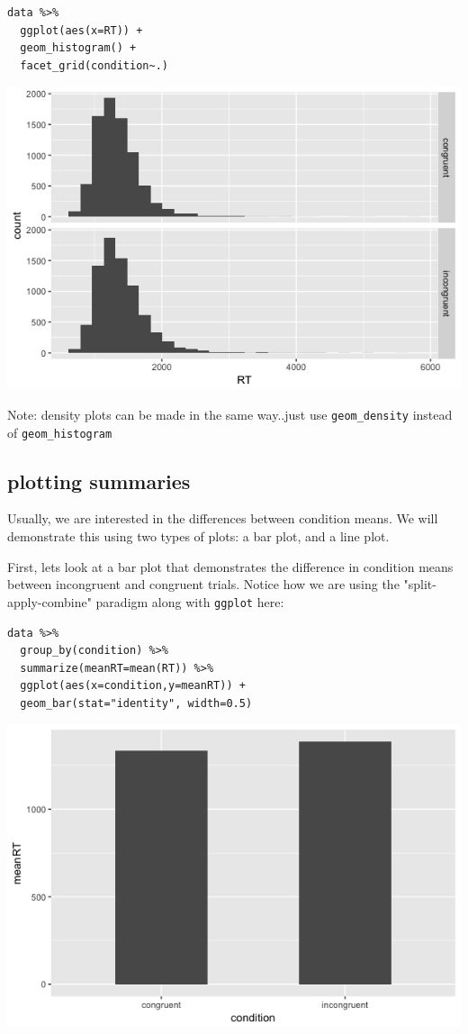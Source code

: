 \documentclass[11pt]{article}
\begin{document}
\begin{verbatim}
data %>%
  ggplot(aes(x=RT)) +
  geom_histogram() +
  facet_grid(condition~.)
\end{verbatim}

\includegraphics[width=.9\linewidth]{figures/week5/faceted.png}

Note: density plots can be made in the same way..just use \texttt{geom\_density} instead of \texttt{geom\_histogram}

\subsection*{plotting summaries}
\label{sec-4-1}

Usually, we are interested in the differences between condition means.  We will demonstrate this using two types of plots: a bar plot, and a line plot.

First, lets look at a bar plot that demonstrates the difference in condition means between incongruent and congruent trials.  Notice how we are using the "split-apply-combine" paradigm along with \texttt{ggplot} here:

\begin{verbatim}
data %>%
  group_by(condition) %>%
  summarize(meanRT=mean(RT)) %>%
  ggplot(aes(x=condition,y=meanRT)) +
  geom_bar(stat="identity", width=0.5)
\end{verbatim}

\includegraphics[width=.9\linewidth]{figures/week5/barplot1.png}
\end{document}
